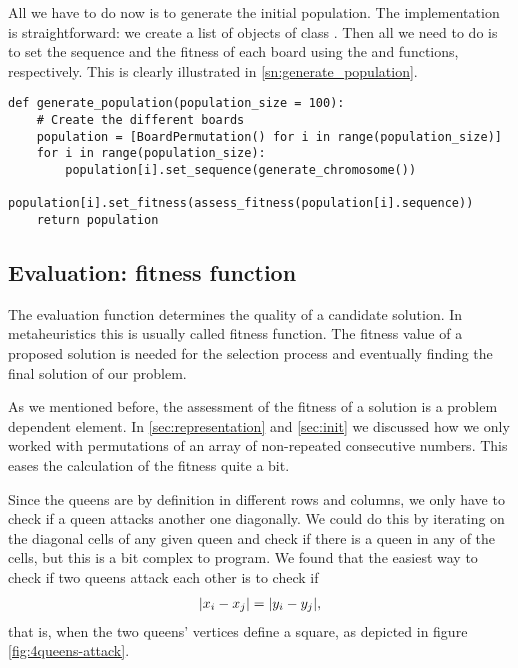 All we have to do now is to generate the initial population. The implementation is straightforward: we create a list of  objects of class . Then all we need to do is to set the sequence and the fitness of each board using the  and  functions, respectively. This is clearly illustrated in \cref{sn:generate_population}.

\begin{lstlisting}[label=sn:generate_population, caption=Population initialization function]
def generate_population(population_size = 100):
	# Create the different boards
	population = [BoardPermutation() for i in range(population_size)]
	for i in range(population_size):
		population[i].set_sequence(generate_chromosome())
		population[i].set_fitness(assess_fitness(population[i].sequence))
	return population
\end{lstlisting}

\subsection{Evaluation: fitness function}\label{sec:fitness}

The evaluation function determines the quality of a candidate solution. In metaheuristics this is usually called fitness function. The fitness value of a proposed solution is needed for the selection process and eventually finding the final solution of our problem.

As we mentioned before, the assessment of the fitness of a solution is a problem dependent element. In \cref{sec:representation} and \cref{sec:init} we discussed how we only worked with permutations of an array of non-repeated consecutive numbers. This eases the calculation of the fitness quite a bit.

Since the queens are by definition in different rows and columns, we only have to check if a queen attacks another one diagonally. We could do this by iterating on the diagonal cells of any given queen and check if there is a queen in any of the cells, but this is a bit complex to program. We found that the easiest way to check if two queens attack each other is to check if
\begin{align}
	\abs{ x_{i} - x_{j} } = \abs{ y_{i} - y_{j} } ,
\end{align}
that is, when the two queens' vertices define a square, as depicted in figure \ref{fig:4queens-attack}.

